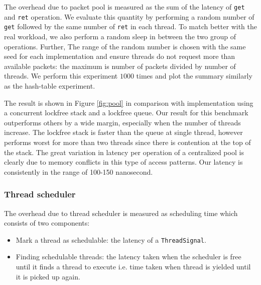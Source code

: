 The overhead due to packet pool is measured as the sum of the latency of
\texttt{get} and \texttt{ret} operation. We evaluate this quantity by
performing a random number of \texttt{get} followed by the same number of
\texttt{ret} in each thread. To match better with the real workload, we also
perform a random sleep in between the two group of operations. Further, The
range of the random number is chosen with the same seed for each implementation
and ensure threads do not request more than available packets: the maximum is
number of packets divided by number of threads. We perform this experiment
$1000$ times and plot the summary similarly as  the hash-table experiment.

The result is shown in Figure \ref{fig:pool} in comparison with implementation
using a concurrent lockfree stack and a lockfree queue. Our result for this
benchmark outperforms others by a wide margin, especially when the number of
threads increase. The lockfree stack is faster than the queue at single thread,
however performs worst for more than two threads since there is contention at
the top of the stack. The great variation in latency per operation of a
centralized pool is clearly due to memory conflicts in this type of access
patterns. Our latency is consistently in the range of 100-150 nanosecond.

\subsubsection{Thread scheduler}
The overhead due to thread scheduler is measured as scheduling time which consists
of two components:
\begin{itemize}
    \item Mark a thread as schedulable: the latency of a \texttt{ThreadSignal}.
    \item Finding schedulable threads: the latency taken when the scheduler is free
      until it finds a thread to execute i.e. time taken when thread is yielded until
      it is picked up again.
\end{itemize}

